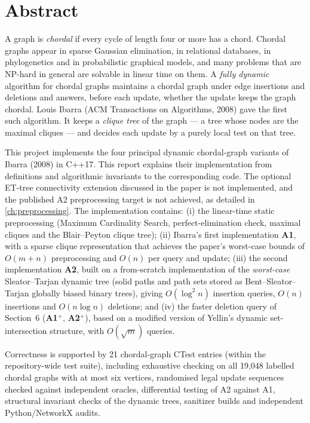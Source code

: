 \documentclass[11pt,a4paper,oneside]{report}
\theoremstyle{plain}
\theoremstyle{definition}
\theoremstyle{remark}
\begin{document}
\chapter*{Abstract}
\thispagestyle{plain}
A graph is \emph{chordal} if every cycle of length four or more has a chord. Chordal graphs
appear in sparse Gaussian elimination, in relational databases, in phylogenetics and in
probabilistic graphical models, and many problems that are NP-hard in general are solvable in
linear time on them. A \emph{fully dynamic} algorithm for chordal graphs maintains a chordal
graph under edge insertions and deletions and answers, before each update, whether the update
keeps the graph chordal. Louis Ibarra (ACM Transactions on Algorithms, 2008) gave the first
such algorithm. It keeps a \emph{clique tree} of the graph --- a tree whose nodes are the
maximal cliques --- and decides each update by a purely local test on that tree.

This project implements the four principal dynamic chordal-graph variants of
Ibarra (2008) in C++17. This report explains their
implementation from definitions and algorithmic invariants to the corresponding code.
The optional ET-tree connectivity extension discussed in the paper is not implemented,
and the published A2 preprocessing target is not achieved, as detailed in
\cref{ch:preprocessing}. The implementation contains:
(i) the linear-time static preprocessing (Maximum Cardinality Search, perfect-elimination
check, maximal cliques and the Blair--Peyton clique tree);
(ii) Ibarra's first implementation \textbf{A1}, with a sparse clique representation that
achieves the paper's worst-case bounds of \(O(m+n)\) preprocessing and \(O(n)\) per query and
update;
(iii) the second implementation \textbf{A2}, built on a from-scratch implementation of the
\emph{worst-case} Sleator--Tarjan dynamic tree (solid paths and path sets stored as
Bent--Sleator--Tarjan globally biased binary trees), giving \(O(\log^2 n)\) insertion queries,
\(O(n)\) insertions and \(O(n\log n)\) deletions; and
(iv) the faster deletion query of Section~6 (\textbf{A1\(^+\)}, \textbf{A2\(^+\)}), based on a
modified version of Yellin's dynamic set-intersection structure, with \(O(\sqrt m)\) queries.

Correctness is supported by 21 chordal-graph CTest entries (within the repository-wide test suite), including exhaustive checking on all
19{,}048 labelled chordal graphs with at most six vertices, randomised legal update sequences
checked against independent oracles, differential testing of A2 against A1, structural
invariant checks of the dynamic trees, sanitizer builds and independent Python/NetworkX audits.
\end{document}
